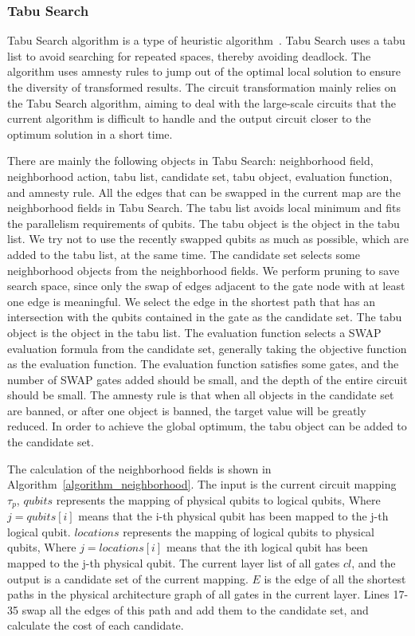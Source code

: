 \documentclass[runningheads]{llncs}
\begin{document}
\subsubsection{Tabu Search}
Tabu Search algorithm is a type of heuristic algorithm~\cite{Glover1990}. Tabu Search uses a tabu list to avoid searching for repeated spaces, thereby avoiding deadlock. The algorithm uses amnesty rules to jump out of the optimal local solution to ensure the diversity of transformed results. The circuit transformation mainly relies on the Tabu Search algorithm, aiming to deal with the large-scale circuits that the current algorithm is difficult to handle and the output circuit closer to the optimum solution in a short time.


There are mainly the following objects in Tabu Search: neighborhood field, neighborhood action, tabu list, candidate set, tabu object, evaluation function, and amnesty rule. All the edges that can be swapped in the current map are the neighborhood fields in Tabu Search. The tabu list avoids local minimum and fits the parallelism requirements of qubits. The tabu object is the object in the tabu list. We try not to use the recently swapped qubits as much as possible, which are added to the tabu list, at the same time. The candidate set selects some neighborhood objects from the neighborhood fields.  We perform pruning to save search space, since only the swap of edges adjacent to the gate node with at least one edge is meaningful. We select the edge in the shortest path that has an intersection with the qubits contained in the gate as the candidate set.
The tabu object is the object in the tabu list. The evaluation function selects a SWAP evaluation formula from the candidate set, 
generally taking the objective function as the evaluation function. The evaluation function satisfies some gates, 
and the number of SWAP gates added should be small, and the depth of the entire circuit should be small. The amnesty rule is that when all objects in the candidate set are banned,  or after one object is banned, the target value will be greatly reduced. In order to achieve the global optimum, the tabu object can be added to the candidate set.

The calculation of the neighborhood fields is shown in Algorithm~\ref{algorithm_neighborhood}. The input is the current circuit mapping $\tau_{p}$, $ qubits $ represents the mapping of physical qubits to logical qubits, Where $ j = qubits [i] $ means that the i-th physical qubit has been mapped to the j-th logical qubit. $ locations $ represents the mapping of logical qubits to physical qubits, Where $ j = locations [i] $ means that the ith logical qubit has been mapped to the j-th physical qubit.
The current layer list of all gates $cl$, and the output is a candidate set of the current mapping. $E$ is the edge of all the shortest paths in the physical architecture graph of all gates in the current layer. Lines 17-35 swap all the edges of this path and add them to the candidate set, and calculate the cost of each candidate.
\end{document}
